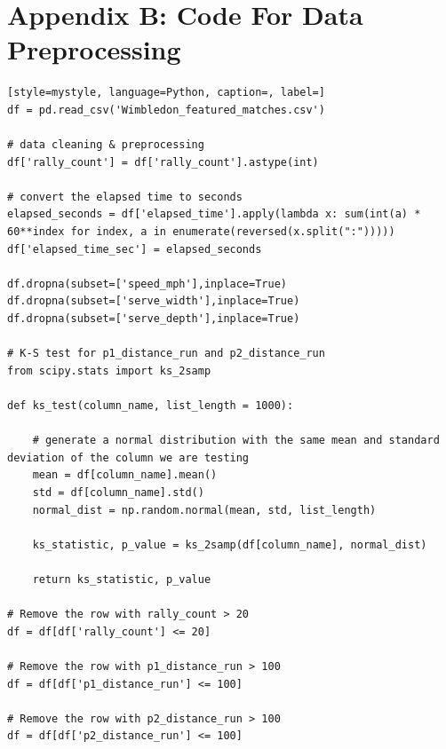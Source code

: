 \documentclass[12pt]{article}
\begin{document}
\section*{Appendix B: Code For Data Preprocessing}
\begin{lstlisting}[style=mystyle, language=Python, caption=, label=]
df = pd.read_csv('Wimbledon_featured_matches.csv')

# data cleaning & preprocessing
df['rally_count'] = df['rally_count'].astype(int)

# convert the elapsed time to seconds
elapsed_seconds = df['elapsed_time'].apply(lambda x: sum(int(a) * 60**index for index, a in enumerate(reversed(x.split(":")))))
df['elapsed_time_sec'] = elapsed_seconds

df.dropna(subset=['speed_mph'],inplace=True)
df.dropna(subset=['serve_width'],inplace=True)
df.dropna(subset=['serve_depth'],inplace=True)

# K-S test for p1_distance_run and p2_distance_run
from scipy.stats import ks_2samp

def ks_test(column_name, list_length = 1000):

    # generate a normal distribution with the same mean and standard deviation of the column we are testing
    mean = df[column_name].mean()
    std = df[column_name].std()
    normal_dist = np.random.normal(mean, std, list_length)

    ks_statistic, p_value = ks_2samp(df[column_name], normal_dist)
    
    return ks_statistic, p_value

# Remove the row with rally_count > 20
df = df[df['rally_count'] <= 20]

# Remove the row with p1_distance_run > 100
df = df[df['p1_distance_run'] <= 100]

# Remove the row with p2_distance_run > 100
df = df[df['p2_distance_run'] <= 100]
\end{lstlisting}

\end{document}
